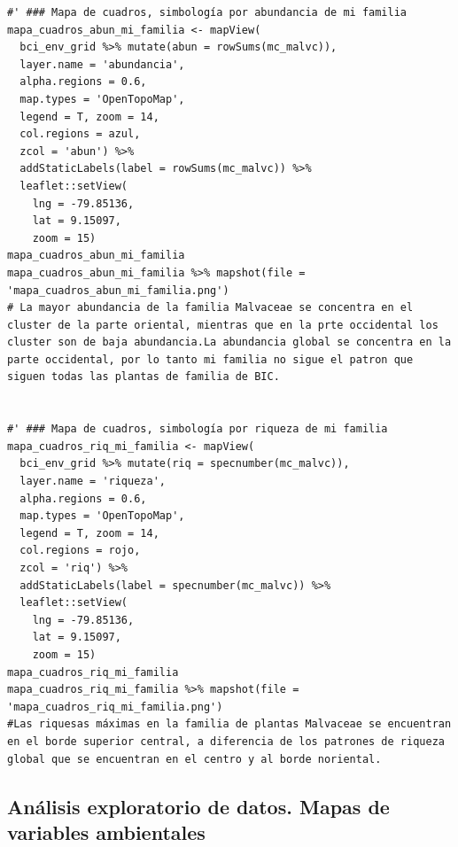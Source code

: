 \documentclass[11pt,]{article}
\begin{document}
\begin{verbatim}
#' ### Mapa de cuadros, simbología por abundancia de mi familia
mapa_cuadros_abun_mi_familia <- mapView(
  bci_env_grid %>% mutate(abun = rowSums(mc_malvc)),
  layer.name = 'abundancia',
  alpha.regions = 0.6,
  map.types = 'OpenTopoMap',
  legend = T, zoom = 14,
  col.regions = azul,
  zcol = 'abun') %>%
  addStaticLabels(label = rowSums(mc_malvc)) %>%
  leaflet::setView(
    lng = -79.85136,
    lat = 9.15097,
    zoom = 15)
mapa_cuadros_abun_mi_familia
mapa_cuadros_abun_mi_familia %>% mapshot(file = 'mapa_cuadros_abun_mi_familia.png')
# La mayor abundancia de la familia Malvaceae se concentra en el cluster de la parte oriental, mientras que en la prte occidental los cluster son de baja abundancia.La abundancia global se concentra en la parte occidental, por lo tanto mi familia no sigue el patron que siguen todas las plantas de familia de BIC.


#' ### Mapa de cuadros, simbología por riqueza de mi familia
mapa_cuadros_riq_mi_familia <- mapView(
  bci_env_grid %>% mutate(riq = specnumber(mc_malvc)),
  layer.name = 'riqueza',
  alpha.regions = 0.6,
  map.types = 'OpenTopoMap',
  legend = T, zoom = 14,
  col.regions = rojo,
  zcol = 'riq') %>%
  addStaticLabels(label = specnumber(mc_malvc)) %>%
  leaflet::setView(
    lng = -79.85136,
    lat = 9.15097,
    zoom = 15)
mapa_cuadros_riq_mi_familia
mapa_cuadros_riq_mi_familia %>% mapshot(file = 'mapa_cuadros_riq_mi_familia.png')
#Las riquesas máximas en la familia de plantas Malvaceae se encuentran en el borde superior central, a diferencia de los patrones de riqueza global que se encuentran en el centro y al borde noriental. 
\end{verbatim}

\subsection{Análisis exploratorio de datos. Mapas de variables
ambientales}\label{anuxe1lisis-exploratorio-de-datos.-mapas-de-variables-ambientales}
\end{document}
